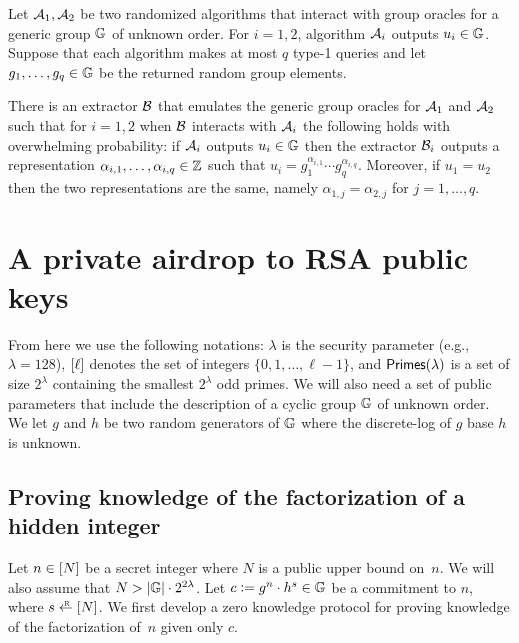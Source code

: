 \documentclass[11pt]{article}
\begin{document}
\begin{lemma}
\label{lem:unique}
Let $\mathcal{A}_1, \mathcal{A}_2$ be two randomized algorithms that interact
with group oracles for a generic group $\mathbb G$ of unknown order.
For $i=1,2$, algorithm $\mathcal{A}_i$ outputs $u_i \in \mathbb G$.
Suppose that each algorithm makes at most $q$ type-1 queries
and let $g_1,\ldots,g_q \in \mathbb G$ be the returned random group elements. 

There is an extractor $\mathcal{B}$ that emulates 
the generic group oracles for $\mathcal{A}_1$ and $\mathcal{A}_2$
such that for $i=1,2$ when $\mathcal{B}$ interacts with $\mathcal{A}_i$ 
the following holds with overwhelming probability:
if $\mathcal{A}_i$ outputs $u_i \in \mathbb G$ 
then the extractor $\mathcal{B}_i$ outputs a representation
$\alpha_{i,1},\ldots,\alpha_{i,q} \in \mathbb Z$
such that $u_i = g_1^{\alpha_{i,1}} \cdots g_q^{\alpha_{i,q}}$.
Moreover, if $u_1 = u_2$ then the two representations are the same,
namely $\alpha_{1,j} = \alpha_{2,j}$ for $j=1,\ldots,q$. 
\end{lemma}




\section{A private airdrop to RSA public keys}\label{sec:rsa}

From here we use the following notations:
$\lambda$ is the security parameter (e.g., $\lambda = 128$), 
$[{\ell}]$ denotes the set of integers $\{0,1,\ldots,\ell-1\}$, and 
$\textsf{Primes}(\lambda)$ is a set of size $2^\lambda$ 
containing the smallest $2^\lambda$ odd primes. 
%
We will also need a set of public parameters that include the description
of a cyclic group $\mathbb G$ of unknown order.  We let $g$ and $h$ be two
random generators of $\mathbb G$ where the discrete-log of $g$ base $h$ is unknown. 


\subsection{Proving knowledge of the factorization of a hidden integer}\label{sec:rsa:proving}

Let $n \in [{N}]$ be a secret integer 
where $N$ is a public upper bound on~$n$.
We will also assume that $N > \lvert \mathbb G \rvert \cdot 2^{2 \lambda}$.
Let $c \mathrel{\mathop:}= g^n \cdot h^s \in \mathbb G$ be a commitment to $n$, 
where $s \rgets \range{N}$.  
We first develop a zero knowledge protocol for proving knowledge of the
factorization of~$n$ given only $c$. 
\end{document}
